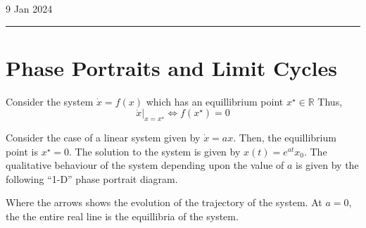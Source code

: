 \hfill\small{9 Jan 2024}
\vspace{0.5em}
\hrule
\vspace{-0.5em}
\section{Phase Portraits and Limit Cycles}

Consider the system \(\dot{x} = f(x) \) which has an equillibrium point \(x^{\star} \in \mathbb{R}\)
Thus,
\[
    \left . \dot{x}  \right |_{x=x^{\star}} \iff f(x^{\star}) = 0
\]  
\begin{example}
    Consider the case of a linear system given by \(\dot{x} = ax\).
     Then, the equillibrium point is \(x^{\star} = 0\). The solution to the system
     is given by \(x(t) = e^{at} x_0\). The qualitative behaviour of the system 
     depending upon the value of \(a\) is given by the following ``1-D'' phase portrait diagram.

     \begin{center}

    \end{center}
    Where the arrows shows the evolution of the trajectory of the system. At \(a = 0\), the
    the entire real line is the equillibria of the system.
\end{example}

